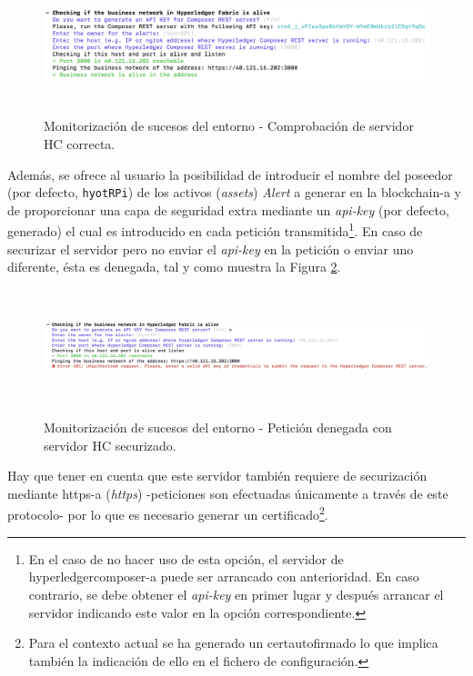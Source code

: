\documentclass[12pt,a4paper, twoside]{report}
\begin{document}
\begin{itemize}
			\begin{figure}[!ht]   
				\caption{Monitorización de sucesos del entorno - Comprobación de servidor HC correcta.} 
				\begin{center} 
					\includegraphics[width=16cm,height=3.3cm]{Images/userGuide/monitoring/hcOk} \\
					\label{fig:userguide_monitoring_hcOk} 
				\end{center}  
			\end{figure}	 
	 	
	 	Además, se ofrece al usuario la posibilidad de introducir el nombre del poseedor (por defecto, \texttt{hyotRPi}) de los activos (\textit{\glspl{asset}}) \textit{Alert} a generar en la \gls{blockchain-a} y de proporcionar una capa de seguridad extra mediante un \textit{api-key} (por defecto, generado) el cual es introducido en cada petición transmitida\footnote{En el caso de no hacer uso de esta opción, el servidor de \gls{hyperledgercomposer-a} puede ser arrancado con anterioridad. En caso contrario, se debe obtener el \textit{api-key} en primer lugar y después arrancar el servidor indicando este valor en la opción correspondiente.}. En caso de securizar el servidor pero no enviar el \textit{api-key} en la petición o enviar uno diferente, ésta es denegada, tal y como muestra la Figura \ref{fig:userguide_monitoring_hcUnauthorized}. \\
	 			 	 
	 		\begin{figure}[!ht]   
				\caption{Monitorización de sucesos del entorno - Petición denegada con servidor HC securizado.} 
				\begin{center} 
					\includegraphics[width=16cm,height=3.3cm]{Images/userGuide/monitoring/hcUnauthorized} \\
					\label{fig:userguide_monitoring_hcUnauthorized} 
				\end{center}  
			\end{figure}	 
			
			Hay que tener en cuenta que este servidor también requiere de securización mediante \gls{https-a} (\textit{\gls{https}}) -peticiones son efectuadas únicamente a través de este protocolo- por lo que es necesario generar un certificado\footnote{Para el contexto actual se ha generado un \gls{certautofirmado} lo que implica también la indicación de ello en el fichero de configuración.}.	 	
	 \end{itemize}
	 	 
\end{document}
